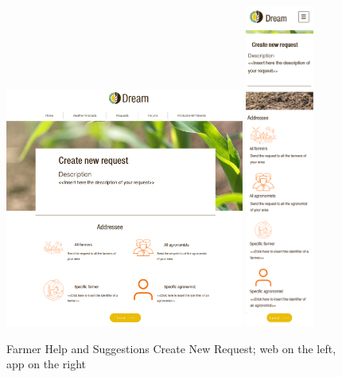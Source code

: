 \documentclass{article}
\begin{document}
        \begin{figure} [h]
            \centering
            \includegraphics[width=0.7\textwidth]{images/UserInterfaces/Farmer/HelpAndSuggestions/CreateNewRequestWeb.png}
            \quad
            \includegraphics[width=0.2\textwidth]{images/UserInterfaces/Farmer/HelpAndSuggestions/CreateNewRequestApp.png}
            \quad
            \caption{\label{fig:farmerHelpNewRequest}Farmer Help and Suggestions Create New Request; web on the left, app on the right}
        \end{figure}
\end{document}
